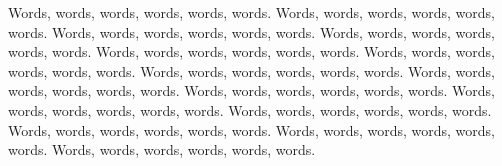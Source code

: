 \documentclass [letterpaper, 12pt] {article}
\begin{document}
Words, words, words, words, words, words. Words, words, words, words, words, words. Words, words, words, words, words, words. Words, words, words, words, words, words. Words, words, words, words, words, words. Words, words, words, words, words, words. Words, words, words, words, words, words. Words, words, words, words, words, words. Words, words, words, words, words, words. Words, words, words, words, words, words. Words, words, words, words, words, words. Words, words, words, words, words, words. Words, words, words, words, words, words. Words, words, words, words, words, words. 




\pagebreak



\end{document}
